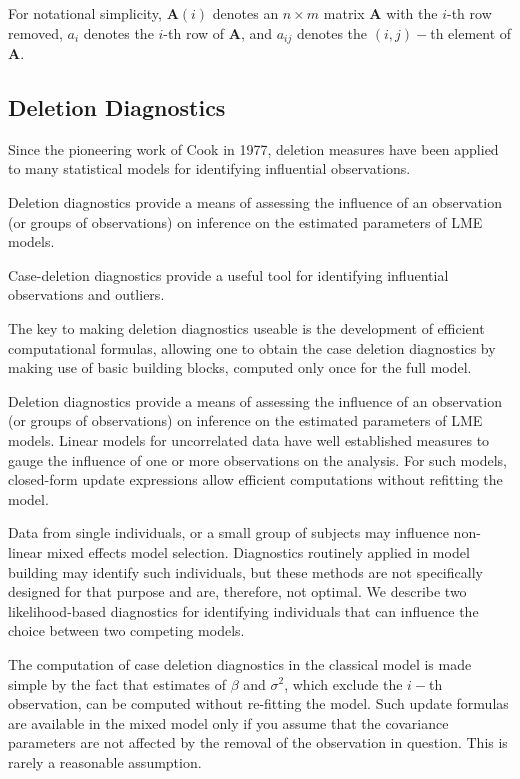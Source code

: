 \documentclass[12pt, a4paper]{report}
\theoremstyle{plain}
\theoremstyle{definition}
\theoremstyle{remark}
\begin{document}
	For notational simplicity, $\boldsymbol{A}(i)$ denotes an $n \times m$ matrix $\boldsymbol{A}$ with the $i$-th row
	removed, $a_i$ denotes the $i$-th row of $\boldsymbol{A}$, and $a_{ij}$ denotes the $(i, j)-$th element of $\boldsymbol{A}$.
	
\newpage
	\subsection{Deletion Diagnostics}
	
	Since the pioneering work of Cook in 1977, deletion measures have been applied to many statistical models for identifying influential observations.
	
	Deletion diagnostics provide a means of assessing the influence of an observation (or groups of observations) on inference on the estimated parameters of LME models.
	
	Case-deletion diagnostics provide a useful tool for identifying influential observations and outliers.
	
	
	The key to making deletion diagnostics useable is the development of efficient computational formulas, allowing one to obtain the  case deletion diagnostics by making use of basic building blocks, computed only once for the full model.
	
	Deletion diagnostics provide a means of assessing the influence of an observation (or groups of observations) on inference on the estimated parameters of LME models. Linear models for uncorrelated data have well established measures to gauge the influence of one or more observations on the analysis. For such models, closed-form update expressions allow efficient computations without refitting the model.
	
	Data from single individuals, or a small group of subjects may influence non-linear mixed effects model selection. Diagnostics routinely applied in model building may identify such individuals, but these methods are not specifically designed for that purpose and are, therefore, not optimal. We describe two likelihood-based diagnostics for identifying individuals that can influence the choice between two competing models.
	
	
	The computation of case deletion diagnostics in the classical model is made simple by the fact that estimates of $\beta$ and $\sigma^2$, which exclude the $i-$th observation, can be computed without re-fitting the model. Such update formulas are available in the mixed model only if you assume that the covariance parameters are not affected by the removal of the observation in question. This is rarely a reasonable assumption.
	
\end{document}
